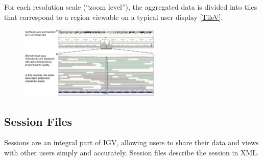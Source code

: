 For each resolution scale (“zoom level”), the aggregated data is divided into
tiles that correspond to a region viewable on a typical user display \ref{TileV}. 



\begin{figure}
    \caption{}
    \centering
    \includegraphics[width=0.6\textwidth]{IGVReadsView.PNG}
    \label{ViewReads}
\end{figure} 

\subsection*{Session Files}
Sessions are an integral part of IGV, allowing users to share their data and
views with other users simply and accurately. Session files describe the session
in XML.

